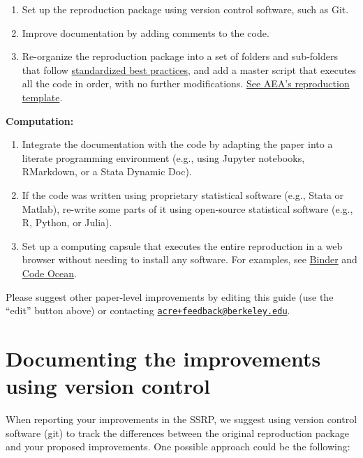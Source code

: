\documentclass[
  openany]{book}
\providecommand{\tightlist}{%
  \setlength{\itemsep}{0pt}\setlength{\parskip}{0pt}}
\begin{document}
\begin{enumerate}
\def\labelenumi{\arabic{enumi}.}
\tightlist
\item
  Set up the reproduction package using version control software, such as Git.\\
\item
  Improve documentation by adding comments to the code.\\
\item
  Re-organize the reproduction package into a set of folders and sub-folders that follow \href{https://www.projecttier.org/tier-protocol/specifications/\#overview-of-the-documentation}{standardized best practices}, and add a master script that executes all the code in order, with no further modifications. \href{https://github.com/AEADataEditor/replication-template}{See AEA's reproduction template}.
\end{enumerate}

\textbf{Computation:}

\begin{enumerate}
\def\labelenumi{\arabic{enumi}.}
\setcounter{enumi}{3}
\tightlist
\item
  Integrate the documentation with the code by adapting the paper into a literate programming environment (e.g., using Jupyter notebooks, RMarkdown, or a Stata Dynamic Doc).\\
\item
  If the code was written using proprietary statistical software (e.g., Stata or Matlab), re-write some parts of it using open-source statistical software (e.g., R, Python, or Julia).\\
\item
  Set up a computing capsule that executes the entire reproduction in a web browser without needing to install any software. For examples, see \href{https://mybinder.org/}{Binder} and \href{https://codeocean.com/}{Code Ocean}.
\end{enumerate}

Please suggest other paper-level improvements by editing this guide (use the ``edit'' button above) or contacting \href{mailto:acre+feedback@berkeley.edu}{\nolinkurl{acre+feedback@berkeley.edu}}.

\hypertarget{doc-impr}{%
\section{Documenting the improvements using version control}\label{doc-impr}}

When reporting your improvements in the SSRP, we suggest using version control software (git) to track the differences between the original reproduction package and your proposed improvements. One possible approach could be the following:
\end{document}
